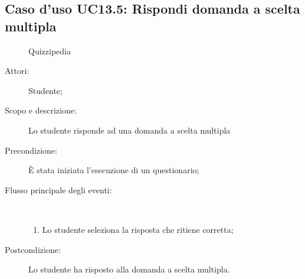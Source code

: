 \subsection{Caso d'uso UC13.5: Rispondi domanda a scelta multipla}
	\begin{figure}[H]
		\centering
		\begin{resizedtikzpicture}{\textwidth}
		\begin{umlsystem}[x=0, fill=lightgray!20]{Quizzipedia}
		\end{umlsystem}
		\end{resizedtikzpicture}
		\caption{}
	\end{figure}
\begin{description}
\item[Attori:] Studente;
\item[Scopo e descrizione:] Lo studente risponde ad una domanda a scelta multipla
      \item[Precondizione:] È stata iniziata l'esecuzione di un questionario;

        \item[Flusso principale degli eventi:] \ 
 \begin{enumerate}
          \item Lo studente seleziona la risposta che ritiene corretta;

      \end{enumerate}
    \item[Postcondizione:] Lo studente ha risposto alla domanda a scelta multipla.
  \end{description}
\hypertarget{UC13.6}{}
